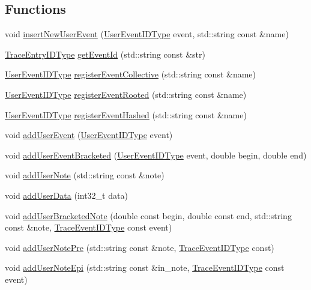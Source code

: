 \subsection*{Functions}
\begin{DoxyCompactItemize}
\item 
void \hyperlink{namespacevt_1_1trace_acbaabde4144cf5291fcc65983e7dc7a0}{insert\+New\+User\+Event} (\hyperlink{namespacevt_1_1trace_a5908920d051c144c89f17c69ed262350}{User\+Event\+I\+D\+Type} event, std\+::string const \&name)
\item 
\hyperlink{namespacevt_1_1trace_a3c14050715ba9eceaeff51fb3de64f2f}{Trace\+Entry\+I\+D\+Type} \hyperlink{namespacevt_1_1trace_ac7c4c6c55b38e5c03f0e541946bcf375}{get\+Event\+Id} (std\+::string const \&str)
\item 
\hyperlink{namespacevt_1_1trace_a5908920d051c144c89f17c69ed262350}{User\+Event\+I\+D\+Type} \hyperlink{namespacevt_1_1trace_a91e24c3e4f4145f8178050065befeda6}{register\+Event\+Collective} (std\+::string const \&name)
\item 
\hyperlink{namespacevt_1_1trace_a5908920d051c144c89f17c69ed262350}{User\+Event\+I\+D\+Type} \hyperlink{namespacevt_1_1trace_ab2627c07d28361b471d0b9008de2f20c}{register\+Event\+Rooted} (std\+::string const \&name)
\item 
\hyperlink{namespacevt_1_1trace_a5908920d051c144c89f17c69ed262350}{User\+Event\+I\+D\+Type} \hyperlink{namespacevt_1_1trace_a9d0309860e6216c541fe5c3af74a5426}{register\+Event\+Hashed} (std\+::string const \&name)
\item 
void \hyperlink{namespacevt_1_1trace_ac973a9573bd3cc0a3fead674a4551ac5}{add\+User\+Event} (\hyperlink{namespacevt_1_1trace_a5908920d051c144c89f17c69ed262350}{User\+Event\+I\+D\+Type} event)
\item 
void \hyperlink{namespacevt_1_1trace_ab090a5c9eae800c6820c88b3fe56c9c8}{add\+User\+Event\+Bracketed} (\hyperlink{namespacevt_1_1trace_a5908920d051c144c89f17c69ed262350}{User\+Event\+I\+D\+Type} event, double begin, double end)
\item 
void \hyperlink{namespacevt_1_1trace_a40f3744bfeb2281ce300d12271f3d48c}{add\+User\+Note} (std\+::string const \&note)
\item 
void \hyperlink{namespacevt_1_1trace_a0ec1ac44fb179f29245a36b887f588f1}{add\+User\+Data} (int32\+\_\+t data)
\item 
void \hyperlink{namespacevt_1_1trace_a34f49ee8f348623aec8e5856d9b79276}{add\+User\+Bracketed\+Note} (double const begin, double const end, std\+::string const \&note, \hyperlink{namespacevt_1_1trace_a64a7185f3e102df8d8258f263ccd1582}{Trace\+Event\+I\+D\+Type} const event)
\item 
void \hyperlink{namespacevt_1_1trace_aee0bc5a9765f7cb09fc59aa9d5a57390}{add\+User\+Note\+Pre} (std\+::string const \&note, \hyperlink{namespacevt_1_1trace_a64a7185f3e102df8d8258f263ccd1582}{Trace\+Event\+I\+D\+Type} const)
\item 
void \hyperlink{namespacevt_1_1trace_a88ba644209a56fabce33c4ff1a8e53ee}{add\+User\+Note\+Epi} (std\+::string const \&in\+\_\+note, \hyperlink{namespacevt_1_1trace_a64a7185f3e102df8d8258f263ccd1582}{Trace\+Event\+I\+D\+Type} const event)
\end{DoxyCompactItemize}


